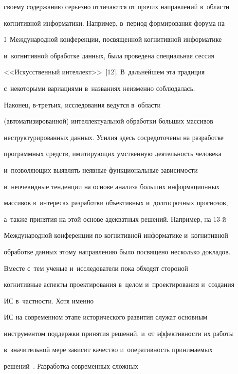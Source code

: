 своему содержанию серьезно отличаются от прочих направлений в~области 


когнитивной информатики. Например, в~период формирования форума на 


I~Международной конференции, посвященной когнитивной информатике 


и~когнитивной обработке данных, была проведена специальная сессия 


<<Искусственный интеллект>>~[12]. В~дальнейшем эта традиция 


с~некоторыми вариациями в~названиях неизменно соблюдалась.


    


    Наконец, в-третьих, исследования ведутся в~области 


(автоматизированной) интеллектуальной обработки больших массивов 


неструктурированных данных. Усилия здесь сосредоточены на разработке 


программных средств, имитирующих умственную деятельность человека 


и~позволяющих выявлять неявные функциональные зависимости 


и~неочевидные тенденции на основе анализа больших информационных 


массивов в~интересах разработки объективных и~долгосрочных прогнозов, 


а~также принятия на этой основе адекватных решений. Например, на 13-й 


Международной конференции по когнитивной информатике и~когнитивной 


обработке данных этому направлению было посвящено несколько докладов.


    


    Вместе с~тем ученые и~исследователи пока обходят стороной 


когнитивные аспекты проектирования в~целом и~проектирования и~создания 


ИС в~част\-ности. Хотя именно 


ИС на современном этапе исторического развития служат основным 


инструментом поддержки принятия решений, и~от эффективности их работы 


в~значительной мере зависит качество и~оперативность при\-ни\-ма\-емых 


решений~\cite{2-luk}. Разработка современных сложных 


